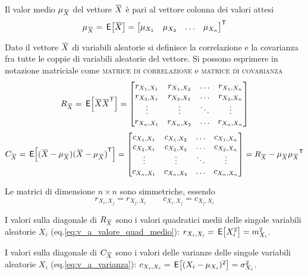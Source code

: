 Il valor medio $\mu_\vect{X}$ del vettore $\vect{X}$ è pari al vettore colonna dei valori attesi
\begin{equation}
	\mu_\vect{X}=\E{\vect{X}}=\trasp{\begin{bmatrix}\mu_{X_1}&\mu_{X_2}&\dots&\mu_{X_n}\end{bmatrix}}
\end{equation}

Dato il vettore $\vect{X}$ di variabili aleatorie si definisce la correlazione e la covarianza fra tutte le coppie di variabili aleatorie del vettore. Si possono esprimere in notazione matriciale come \textsc{matrice di correlazione} e \textsc{matrice di covarianza}
\begin{equation}
\label{eq:matrice_correlazione}
	R_\vect{X}=\E{\vect{X}\trasp{\vect{X}}}=\begin{bmatrix}r_{X_1,X_1}&r_{X_1,X_2}&\dots&r_{X_1,X_n}\\r_{X_2,X_1}&r_{X_2,X_2}&\dots&r_{X_2,X_n}\\\vdots&\vdots&\ddots&\vdots\\r_{X_n,X_1}&r_{X_n,X_2}&\dots&r_{X_n,X_n}\end{bmatrix}
\end{equation}
\begin{equation}
\label{eq:matrice_covarianza}
	C_\vect{X}=\E{(\vect{X}-\mu_\vect{X})\trasp{(\vect{X}-\mu_\vect{X})}}=\begin{bmatrix}c_{X_1,X_1}&c_{X_1,X_2}&\dots&c_{X_1,X_n}\\c_{X_2,X_1}&c_{X_2,X_2}&\dots&c_{X_2,X_n}\\\vdots&\vdots&\ddots&\vdots\\c_{X_n,X_1}&c_{X_n,X_2}&\dots&c_{X_n,X_n}\end{bmatrix}=R_\vect{X}-\mu_\vect{X}\trasp{\mu_\vect{X}}
\end{equation}

Le matrici di dimensione $n\times n$ sono simmetriche, essendo
\[
	r_{X_i,X_j}=r_{X_j,X_i}\qquad c_{X_i,X_j}=c_{X_j,X_i}
\]

I valori sulla diagonale di $R_\vect{X}$ sono i valori quadratici medii delle singole variabili aleatorie $X_i$ (eq.\ref{eq:v_a_valore_quad_medio}): $r_{X_i,X_i}=\,{\operatorname{\mathsf{E}}}\!\left[{X^2_i}\right]=m^2_{X_i}$.

I valori sulla diagonale di $C_\vect{X}$ sono i valori delle varianze delle singole variabili aleatorie $X_i$ (eq.\ref{eq:v_a_varianza}): $c_{X_i,X_i}=\,{\operatorname{\mathsf{E}}}\!\left[{(X_i-\mu_{X_i})^2}\right]=\sigma^2_{X_i}$.

